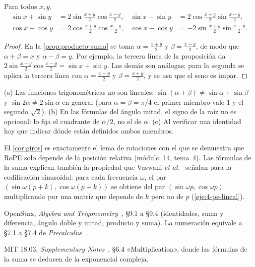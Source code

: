 \begin{corolario}\label{cor:suma-producto}
Para todos $x,y$,
\begin{align*}
\sin x+\sin y&=2\sin\tfrac{x+y}{2}\cos\tfrac{x-y}{2}, & \sin x-\sin y&=2\cos\tfrac{x+y}{2}\sin\tfrac{x-y}{2},\\
\cos x+\cos y&=2\cos\tfrac{x+y}{2}\cos\tfrac{x-y}{2}, & \cos x-\cos y&=-2\sin\tfrac{x+y}{2}\sin\tfrac{x-y}{2}.
\end{align*}
\end{corolario}

\begin{proof}
En la \cref{prop:producto-suma} se toma $\alpha=\frac{x+y}{2}$ y $\beta=\frac{x-y}{2}$, de modo que $\alpha+\beta=x$ y $\alpha-\beta=y$. Por ejemplo, la tercera línea de la proposición da $2\sin\frac{x+y}{2}\cos\frac{x-y}{2}=\sin x+\sin y$. Las demás son análogas; para la segunda se aplica la tercera línea con $\alpha=\frac{x-y}{2}$ y $\beta=\frac{x+y}{2}$, y se usa que el seno es impar.
\end{proof}

\begin{observacion}
(a) Las funciones trigonométricas no son lineales: $\sin(\alpha+\beta)\ne\sin\alpha+\sin\beta$ y $\sin 2\alpha\ne 2\sin\alpha$ en general (para $\alpha=\beta=\pi/4$ el primer miembro vale $1$ y el segundo $\sqrt2$). (b) En las fórmulas del ángulo mitad, el signo de la raíz no es opcional: lo fija el cuadrante de $\alpha/2$, no el de $\alpha$. (c) Al verificar una identidad hay que indicar dónde están definidos ambos miembros.
\end{observacion}

\begin{observacion}
El \cref{cor:giros} es exactamente el lema de rotaciones con el que se demuestra que RoPE solo depende de la posición relativa (módulo~14, tema~4). Las fórmulas de la suma explican también la propiedad que Vaswani \emph{et al.}~\cite[§3.5]{vaswani} señalan para la codificación sinusoidal: para cada frecuencia $\omega$, el par $(\sin\omega(p+k),\cos\omega(p+k))$ se obtiene del par $(\sin\omega p,\cos\omega p)$ multiplicando por una matriz que depende de $k$ pero no de $p$ (\cref{eje:4-pe-lineal}).
\end{observacion}

\begin{lecturas}
\item OpenStax, \emph{Algebra and Trigonometry}~\cite{osat}, §9.1 a §9.4 (identidades, suma y diferencia, ángulo doble y mitad, producto y suma). La numeración equivale a §7.1 a §7.4 de \emph{Precalculus}~\cite{osprecalc}.
\item MIT 18.03, \emph{Supplementary Notes}~\cite{mit1803}, §6.4 «Multiplication», donde las fórmulas de la suma se deducen de la exponencial compleja.
\end{lecturas}

